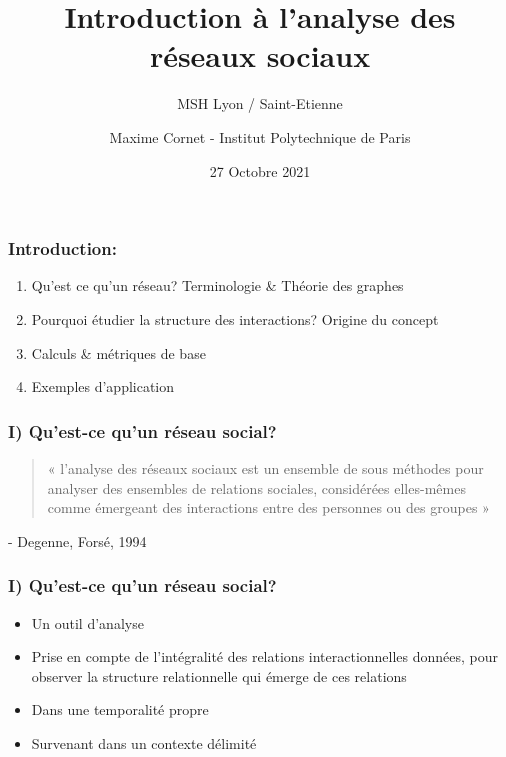 \documentclass{beamer}
\title{Introduction à l'analyse des réseaux sociaux}
\subtitle{MSH Lyon / Saint-Etienne}
\author{Maxime Cornet - Institut Polytechnique de Paris}
\date{27 Octobre 2021}
\begin{document}
\begin{frame}
    \titlepage
\end{frame}

\begin{frame}
    \frametitle{Introduction:}
    \begin{enumerate}[I]
        \item Qu'est ce qu'un réseau? Terminologie \& Théorie des graphes
        \item Pourquoi étudier la structure des interactions? Origine du concept
        \item Calculs \& métriques de base
        \item Exemples d'application
    \end{enumerate}
\end{frame}

\begin{frame}
    \frametitle{I) Qu'est-ce qu'un réseau social?}
\begin{center}
    \begin{quotation}
        « l’analyse des réseaux sociaux est un ensemble de sous méthodes pour analyser des ensembles de relations sociales, considérées elles-mêmes comme émergeant des interactions entre des personnes ou des groupes »
    \end{quotation}
    - Degenne, Forsé, 1994
\end{center}
\end{frame}

\begin{frame}
    \frametitle{I) Qu'est-ce qu'un réseau social?}
\begin{itemize}
    \item Un outil d'analyse
    \item Prise en compte de l’intégralité des relations interactionnelles données, pour observer la structure relationnelle qui émerge de ces relations
    \item Dans une temporalité propre 
    \item Survenant dans un contexte délimité
\end{itemize}
\end{frame}
\end{document}
